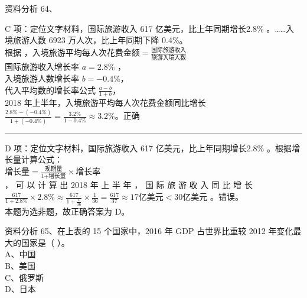 \documentclass[aspectratio=169]{beamer}
\begin{document}
\begin{frame}[t]{资料分析}
    64、
    {\scriptsize
    C 项：定位文字材料，国际旅游收入 617 亿美元，比上年同期增长2.8\% 。……入境旅游人数 6923 万人次，比上年同期下降 0.4\%。\\
    根据 ，$\text{入境旅游平均每人次花费金额} = \frac{\text{国际旅游收入}}{\text{旅游入境人数}}$\\
    国际旅游收入增长率 $a=2.8\%$ ，\\
    入境旅游人数增长率 $b=-0.4\%$，\\
    代入平均数的增长率公式 $\frac{a-b}{1+b}$，\\
    2018 年上半年，入境旅游平均每人次花费金额同比增长 $\frac{2.8\% - (-0.4\%)}{1+(-0.4\%)} = \frac{3.2\%}{1-0.4\%} \approx 3.2\%$。正确\\

    \rule{\textwidth}{0.4pt}

    D 项：定位文字材料，国际旅游收入 617 亿美元，比上年同期增长2.8\% 。根据增长量计算公式：\\
    $\text{增长量} = \frac{\text{现期量}}{\text{1+增长量}} \times \text{增长率}$\\
    ， 可 以 计 算 出 2018 年 上 半 年 ， 国 际 旅 游 收 入 同 比 增 长
    $\frac{617}{1+2.8\%} \times 2.8\% \approx \frac{617}{1+\frac{1}{36}} \times \frac{1}{36}  = \frac{617}{37} \approx 17 \text{亿美元} < 30 \text{亿美元}$  。错误。 \\

    本题为选非题，故正确答案为 D。
    }
\end{frame}                           






\begin{frame}[t]{资料分析}
    65、在上表的 15 个国家中，2016 年 GDP 占世界比重较 2012 年变化最大的国家是（ ）。 \\
    A、中国                                                                           \\
    B、美国                                                                           \\
    C、俄罗斯                                                                         \\
    D、日本                                                                           \\
\end{frame}                           
\end{document}
